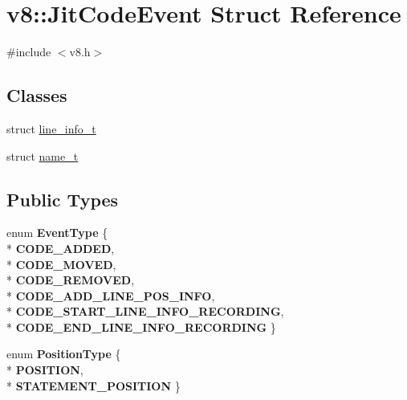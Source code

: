 \hypertarget{structv8_1_1_jit_code_event}{}\section{v8\+:\+:Jit\+Code\+Event Struct Reference}
\label{structv8_1_1_jit_code_event}


{\ttfamily \#include $<$v8.\+h$>$}

\subsection*{Classes}
\begin{DoxyCompactItemize}
\item 
struct \hyperlink{structv8_1_1_jit_code_event_1_1line__info__t}{line\+\_\+info\+\_\+t}
\item 
struct \hyperlink{structv8_1_1_jit_code_event_1_1name__t}{name\+\_\+t}
\end{DoxyCompactItemize}
\subsection*{Public Types}
\begin{DoxyCompactItemize}
\item 
enum {\bfseries Event\+Type} \{ \\*
{\bfseries C\+O\+D\+E\+\_\+\+A\+D\+D\+ED}, 
\\*
{\bfseries C\+O\+D\+E\+\_\+\+M\+O\+V\+ED}, 
\\*
{\bfseries C\+O\+D\+E\+\_\+\+R\+E\+M\+O\+V\+ED}, 
\\*
{\bfseries C\+O\+D\+E\+\_\+\+A\+D\+D\+\_\+\+L\+I\+N\+E\+\_\+\+P\+O\+S\+\_\+\+I\+N\+FO}, 
\\*
{\bfseries C\+O\+D\+E\+\_\+\+S\+T\+A\+R\+T\+\_\+\+L\+I\+N\+E\+\_\+\+I\+N\+F\+O\+\_\+\+R\+E\+C\+O\+R\+D\+I\+NG}, 
\\*
{\bfseries C\+O\+D\+E\+\_\+\+E\+N\+D\+\_\+\+L\+I\+N\+E\+\_\+\+I\+N\+F\+O\+\_\+\+R\+E\+C\+O\+R\+D\+I\+NG}
 \}\hypertarget{structv8_1_1_jit_code_event_ac4f8e391762567a2710eb5552b5f11f7}{}\label{structv8_1_1_jit_code_event_ac4f8e391762567a2710eb5552b5f11f7}

\item 
enum {\bfseries Position\+Type} \{ \\*
{\bfseries P\+O\+S\+I\+T\+I\+ON}, 
\\*
{\bfseries S\+T\+A\+T\+E\+M\+E\+N\+T\+\_\+\+P\+O\+S\+I\+T\+I\+ON}
 \}\hypertarget{structv8_1_1_jit_code_event_a02ca6a3e363d0d95142591fd454c8ba9}{}\label{structv8_1_1_jit_code_event_a02ca6a3e363d0d95142591fd454c8ba9}

\end{DoxyCompactItemize}
